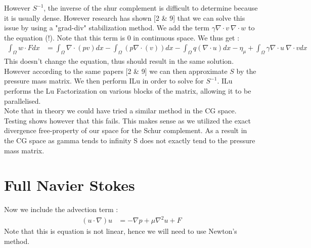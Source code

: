 \documentclass[11pt,twoside,a4paper]{article}
\begin{document}
 However $S^{-1}$, the inverse of the shur complement is difficult to determine because it is usually dense. However research has shown [2 \& 9] that we can solve this issue by using a "grad-div" stabilization method. We add the term $\gamma \nabla \cdot v \: \nabla \cdot w$ to the equation (!). Note that this term is 0 in continuous space. We thus get : 
\begin{align}
\int_\Omega w \cdot F dx &= \int_\Omega \nabla \cdot (p v) dx - \int_\Omega ( p \nabla \cdot (v)) dx - \int_\Omega q (\nabla \cdot u) dx  - \eta_\mu + \int_\Omega \gamma \nabla \cdot u \: \nabla \cdot v dx
\end{align}
This doesn't change the equation, thus should result in the same solution. However according to the same papers [2 \& 9] we can then approximate $S$ by the pressure mass matrix. We then perform ILu in order to solve for $S^{-1}$. ILu performs the Lu Factorization on various blocks of the matrix, allowing it to be parallelised.\\
Note that in theory we could have tried a similar method in the CG space.
Testing shows however that this fails.
This makes sense as we utilized the exact divergence free-property of our space for the Schur complement.
As a result in the CG space as gamma tends to infinity S does not exactly tend to the pressure mass matrix.

\section{Full Navier Stokes}
Now we include the advection term : 
\begin{align*}
(u \cdot \nabla) u &= -\nabla p + \mu \nabla^2 u + F
\end{align*}
Note that this is equation is not linear, hence we will need to use Newton's method.\\ 
\end{document}
